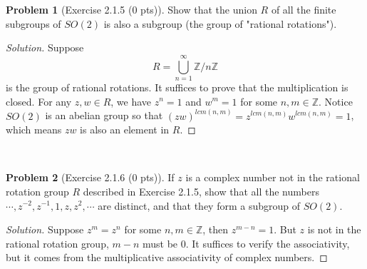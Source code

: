 \documentclass{article}
\theoremstyle{definition}
\newtheorem{problem}{Problem}
\theoremstyle{plain}
\begin{document}
\begin{problem}[Exercise 2.1.5 (0 pts)]Show that the union $R$ of all the finite subgroups of $SO(2)$ is also a subgroup (the group of "rational rotations").
\end{problem}
\begin{adjustwidth}{0.7cm}{}
\color{blue}
\begin{proof}[Solution]Suppose
\begin{displaymath}
R=\bigcup_{n=1}^\infty\mathbb{Z}/n\mathbb{Z}
\end{displaymath}
is the group of rational rotations. It suffices to prove that the multiplication is closed. For any $z,w\in R$, we have $z^n=1$ and $w^m=1$ for some $n,m\in\mathbb{Z}$. Notice $SO(2)$ is an abelian group so that $(zw)^{lcm(n,m)}=z^{lcm(n,m)}w^{lcm(n,m)}=1$, which means $zw$ is also an element in $R$.
\end{proof}
\color{black}
\end{adjustwidth}
~\par

\begin{problem}[Exercise 2.1.6 (0 pts)]If $z$ is a complex number not in the rational rotation group $R$ described in Exercise 2.1.5, show that all the numbers $\cdots,z^{-2},z^{-1},1,z,z^2,\cdots$ are distinct, and that they form a subgroup of $SO(2)$.
\end{problem}
\begin{adjustwidth}{0.7cm}{}
\color{blue}
\begin{proof}[Solution]Suppose $z^m=z^n$ for some $n,m\in\mathbb{Z}$, then $z^{m-n}=1$. But $z$ is not in the rational rotation group, $m-n$ must be 0. It suffices to verify the associativity, but it comes from the multiplicative associativity of complex numbers.
\end{proof}
\color{black}
\end{adjustwidth}
~\par
\end{document}
